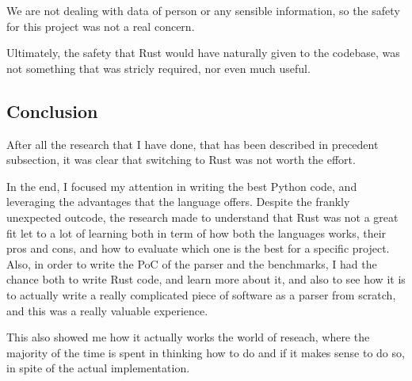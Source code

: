 We are not dealing with data of person or any sensible information, so the
safety for this project was not a real concern.

Ultimately, the safety that Rust would have naturally given to the codebase, was
not something that was stricly required, nor even much useful.

\subsection[Conclusion]{Conclusion}
After all the research that I have done, that has been described in precedent
subsection, it was clear that switching to Rust was not worth the effort.

In the end, I focused my attention in writing the best Python code, and leveraging
the advantages that the language offers. Despite the frankly unexpected outcode,
the research made to understand that Rust was not a great fit let to a lot of learning
both in term of how both the languages works, their pros and cons, and how to evaluate
which one is the best for a specific project. Also, in order to write the PoC of
the parser and the benchmarks, I had the chance both to write Rust code, and learn
more about it, and also to see how it is to actually write a really complicated
piece of software as a parser from scratch, and this was a really valuable experience.

This also showed me how it actually works the world of reseach, where the
majority of the time is spent in thinking how to do and if it makes sense to do
so, in spite of the actual implementation.
